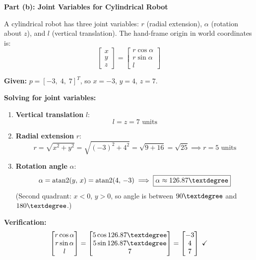 \documentclass[12pt,a3paper]{article}
\begin{document}
\begin{enumerate}
\begin{tcolorbox}[enhanced,breakable,ansbox,colback=cC!4,colframe=cC,
  boxrule=0.8pt,arc=5pt,
  title={\textbf{Answer}},fonttitle=\bfseries\color{white},colbacktitle=cC]
\medskip
\textbf{Part (b): Joint Variables for Cylindrical Robot}

\medskip
A cylindrical robot has three joint variables: $r$ (radial extension),
$\alpha$ (rotation about $z$), and $l$ (vertical translation). The
hand-frame origin in world coordinates is:
\[
  \begin{bmatrix}x\\y\\z\end{bmatrix}
  = \begin{bmatrix}r\cos\alpha\\r\sin\alpha\\l\end{bmatrix}
\]

\textbf{Given:} $p = [-3,\;4,\;7]^T$, so $x=-3$, $y=4$, $z=7$.

\textbf{Solving for joint variables:}

\begin{enumerate}[label=\textbf{\arabic*.}]
  \item \textbf{Vertical translation} $l$:
    \[
      \boxed{l = z = 7 \text{ units}}
    \]

  \item \textbf{Radial extension} $r$:
    \[
      r = \sqrt{x^2 + y^2} = \sqrt{(-3)^2 + 4^2} = \sqrt{9+16} = \sqrt{25}
      \implies \boxed{r = 5 \text{ units}}
    \]

  \item \textbf{Rotation angle} $\alpha$:
    \[
      \alpha = \mathrm{atan2}(y,\,x) = \mathrm{atan2}(4,\,-3)
      \implies \boxed{\alpha \approx 126.87\textdegree}
    \]
    (Second quadrant: $x<0$, $y>0$, so angle is between $90\textdegree$
    and $180\textdegree$.)
\end{enumerate}

\textbf{Verification:}
\[
  \begin{bmatrix}r\cos\alpha\\r\sin\alpha\\l\end{bmatrix}
  = \begin{bmatrix}5\cos126.87\textdegree\\5\sin126.87\textdegree\\7\end{bmatrix}
  = \begin{bmatrix}-3\\4\\7\end{bmatrix} \;\checkmark
\]


\end{tcolorbox}
\end{enumerate}
\end{document}

